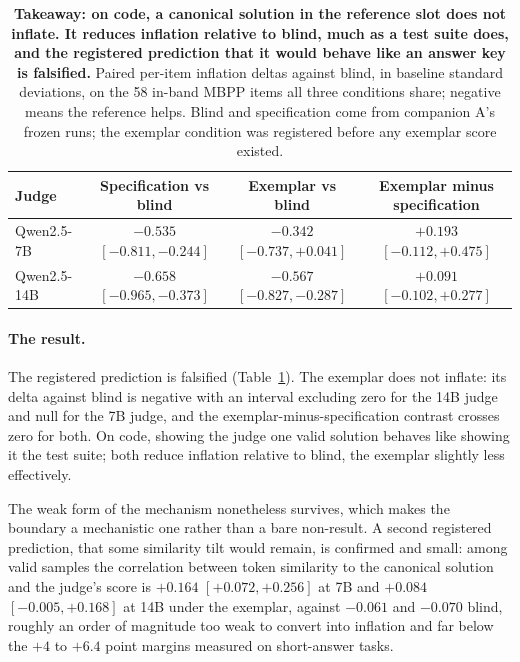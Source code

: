 \documentclass[11pt]{article}
\begin{document}
\begin{table}[tbp]
\centering
\small
\setlength{\tabcolsep}{6pt}
\begin{tabular}{lccc}
\toprule
Judge & Specification vs blind & Exemplar vs blind & Exemplar minus specification \\
\midrule
Qwen2.5-7B  & $-0.535$ {\scriptsize$[-0.811,-0.244]$} & $-0.342$ {\scriptsize$[-0.737,+0.041]$} & $+0.193$ {\scriptsize$[-0.112,+0.475]$} \\
Qwen2.5-14B & $-0.658$ {\scriptsize$[-0.965,-0.373]$} & $-0.567$ {\scriptsize$[-0.827,-0.287]$} & $+0.091$ {\scriptsize$[-0.102,+0.277]$} \\
\bottomrule
\end{tabular}
\caption{\textbf{Takeaway: on code, a canonical solution in the reference slot does not inflate. It reduces inflation relative to blind, much as a test suite does, and the registered prediction that it would behave like an answer key is falsified.}
Paired per-item inflation deltas against blind, in baseline standard deviations, on the 58 in-band MBPP items all three conditions share; negative means the reference helps. Blind and specification come from companion A's frozen runs; the exemplar condition was registered before any exemplar score existed.}
\label{tab:code}
\end{table}

\paragraph{The result.}
The registered prediction is falsified (Table~\ref{tab:code}).
The exemplar does not inflate: its delta against blind is negative with an interval excluding zero for the 14B judge and null for the 7B judge, and the exemplar-minus-specification contrast crosses zero for both.
On code, showing the judge one valid solution behaves like showing it the test suite; both reduce inflation relative to blind, the exemplar slightly less effectively.

The weak form of the mechanism nonetheless survives, which makes the boundary a mechanistic one rather than a bare non-result.
A second registered prediction, that some similarity tilt would remain, is confirmed and small: among valid samples the correlation between token similarity to the canonical solution and the judge's score is $+0.164$ $[+0.072, +0.256]$ at 7B and $+0.084$ $[-0.005, +0.168]$ at 14B under the exemplar, against $-0.061$ and $-0.070$ blind, roughly an order of magnitude too weak to convert into inflation and far below the $+4$ to $+6.4$ point margins measured on short-answer tasks.
\end{document}
